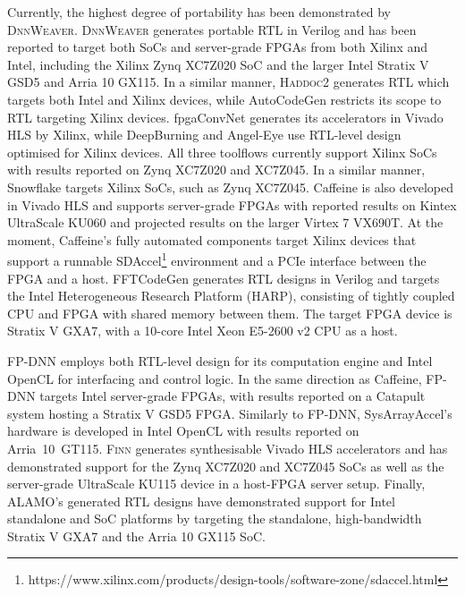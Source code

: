 \documentclass[format=acmsmall, review=false, screen=true]{acmart}
\begin{document}
Currently, the highest degree of portability has been demonstrated by \textsc{DnnWeaver}. \textsc{DnnWeaver} generates portable RTL in Verilog and has been reported to target both SoCs and server-grade FPGAs from both Xilinx and Intel, including the Xilinx Zynq XC7Z020 SoC and the larger Intel Stratix V GSD5 and Arria 10 GX115. {\color{black}In a similar manner, \textsc{Haddoc2} generates RTL which targets both Intel and Xilinx devices, while AutoCodeGen restricts its scope to RTL targeting Xilinx devices.} {\color{black}fpgaConvNet generates its accelerators in Vivado HLS by Xilinx, while DeepBurning and Angel-Eye use RTL-level design optimised for Xilinx devices.} All three toolflows currently support Xilinx SoCs with results reported on Zynq XC7Z020 and XC7Z045. {\color{black}In a similar manner, Snowflake targets Xilinx SoCs, such as Zynq XC7Z045.} Caffeine is also developed in Vivado HLS and supports server-grade FPGAs with reported results on Kintex UltraScale KU060 and projected results on the larger Virtex 7 VX690T. At the moment, Caffeine's fully automated components target Xilinx devices that support a runnable SDAccel\footnote{https://www.xilinx.com/products/design-tools/software-zone/sdaccel.html} environment and a PCIe interface between the FPGA and a host. {\color{black}FFTCodeGen generates RTL designs in Verilog and targets the Intel Heterogeneous Research Platform (HARP), consisting of tightly coupled CPU and FPGA with shared memory between them. The target FPGA device is Stratix V GXA7, with a 10-core Intel Xeon E5-2600 v2 CPU as a host.}

FP-DNN employs both RTL-level design for its computation engine and Intel OpenCL for interfacing and control logic. In the same direction as Caffeine, FP-DNN targets Intel server-grade FPGAs, with results reported on a Catapult system \cite{Caulfield2016} hosting a Stratix V GSD5 FPGA. Similarly to FP-DNN, SysArrayAccel's hardware is developed in Intel OpenCL with results reported on \mbox{Arria 10 GT115}. \textsc{Finn} generates synthesisable Vivado HLS accelerators and has demonstrated support for the Zynq XC7Z020 and XC7Z045 SoCs as well as the server-grade UltraScale KU115 device in a host-FPGA server setup. Finally, ALAMO's generated RTL designs have demonstrated support for Intel standalone {\color{black}and SoC} platforms by targeting the standalone, high-bandwidth Stratix V GXA7 {\color{black}and the Arria 10 GX115 SoC}.
\end{document}
